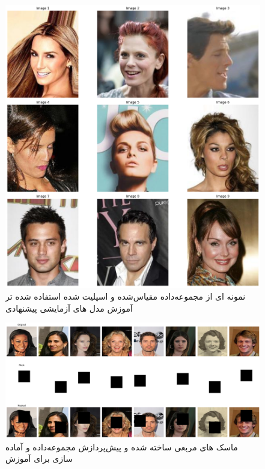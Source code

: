 \begin{figure}
	\centering
	\includegraphics[width=0.7\linewidth]{figs/celebhq2lstm}
	\caption{نمونه ای از مجموعه‌داده مقیاس‌شده و اسپلیت شده استفاده شده تر آموزش مدل های آزمایشی پیشنهادی}
	\label{fig:celebhq2lstm}
\end{figure}


\begin{figure}
	\centering
	\includegraphics[width=1\linewidth]{figs/lstm1masks}
	\caption{ماسک های مربعی ساخته شده و پیش‌پردازش مجموعه‌داده و آماده سازی برای آموزش}
	\label{fig:lstm1masks}
\end{figure}


\warningToSelfUnfinished
